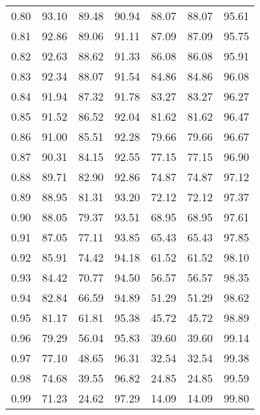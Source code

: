 \begin{tabular}{|c|c|c|c|c|c|c|}
      0.80 &     93.10 &     89.48 &      90.94 &   88.07 &      88.07 &         95.61 \\
      0.81 &     92.86 &     89.06 &      91.11 &   87.09 &      87.09 &         95.75 \\
      0.82 &     92.63 &     88.62 &      91.33 &   86.08 &      86.08 &         95.91 \\
      0.83 &     92.34 &     88.07 &      91.54 &   84.86 &      84.86 &         96.08 \\
      0.84 &     91.94 &     87.32 &      91.78 &   83.27 &      83.27 &         96.27 \\
      0.85 &     91.52 &     86.52 &      92.04 &   81.62 &      81.62 &         96.47 \\
      0.86 &     91.00 &     85.51 &      92.28 &   79.66 &      79.66 &         96.67 \\
      0.87 &     90.31 &     84.15 &      92.55 &   77.15 &      77.15 &         96.90 \\
      0.88 &     89.71 &     82.90 &      92.86 &   74.87 &      74.87 &         97.12 \\
      0.89 &     88.95 &     81.31 &      93.20 &   72.12 &      72.12 &         97.37 \\
      0.90 &     88.05 &     79.37 &      93.51 &   68.95 &      68.95 &         97.61 \\
      0.91 &     87.05 &     77.11 &      93.85 &   65.43 &      65.43 &         97.85 \\
      0.92 &     85.91 &     74.42 &      94.18 &   61.52 &      61.52 &         98.10 \\
      0.93 &     84.42 &     70.77 &      94.50 &   56.57 &      56.57 &         98.35 \\
      0.94 &     82.84 &     66.59 &      94.89 &   51.29 &      51.29 &         98.62 \\
      0.95 &     81.17 &     61.81 &      95.38 &   45.72 &      45.72 &         98.89 \\
      0.96 &     79.29 &     56.04 &      95.83 &   39.60 &      39.60 &         99.14 \\
      0.97 &     77.10 &     48.65 &      96.31 &   32.54 &      32.54 &         99.38 \\
      0.98 &     74.68 &     39.55 &      96.82 &   24.85 &      24.85 &         99.59 \\
      0.99 &     71.23 &     24.62 &      97.29 &   14.09 &      14.09 &         99.80 \\
\bottomrule
\end{tabular}
